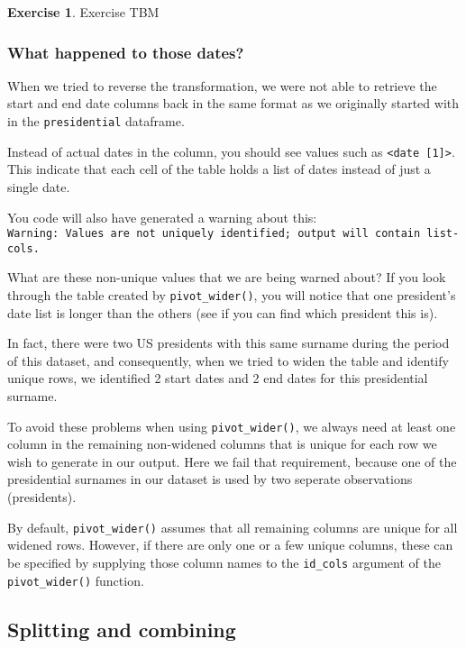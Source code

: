 \documentclass[
]{article}
\theoremstyle{definition}
\theoremstyle{definition}
\theoremstyle{definition}
\newtheorem{exercise}{Exercise}[section]
\theoremstyle{definition}
\theoremstyle{remark}
\begin{document}
\begin{exercise}
Exercise TBM
\end{exercise}

\hypertarget{what-happened-to-those-dates}{%
\subsubsection{What happened to those dates?}\label{what-happened-to-those-dates}}

When we tried to reverse the transformation, we were not able to retrieve the start and end date columns back in the same format as we originally started with in the \texttt{presidential} dataframe.

Instead of actual dates in the column, you should see values such as \texttt{\textless{}date\ {[}1{]}\textgreater{}}. This indicate that each cell of the table holds a list of dates instead of just a single date.

You code will also have generated a warning about this: \texttt{Warning:\ Values\ are\ not\ uniquely\ identified;\ output\ will\ contain\ list-cols.}

What are these non-unique values that we are being warned about? If you look through the table created by \texttt{pivot\_wider()}, you will notice that one president's date list is longer than the others (see if you can find which president this is).

In fact, there were two US presidents with this same surname during the period of this dataset, and consequently, when we tried to widen the table and identify unique rows, we identified 2 start dates and 2 end dates for this presidential surname.

To avoid these problems when using \texttt{pivot\_wider()}, we always need at least one column in the remaining non-widened columns that is unique for each row we wish to generate in our output. Here we fail that requirement, because one of the presidential surnames in our dataset is used by two seperate observations (presidents).

By default, \texttt{pivot\_wider()} assumes that all remaining columns are unique for all widened rows. However, if there are only one or a few unique columns, these can be specified by supplying those column names to the \texttt{id\_cols} argument of the \texttt{pivot\_wider()} function.

\hypertarget{splitting-and-combining}{%
\subsection{Splitting and combining}\label{splitting-and-combining}}
\end{document}
